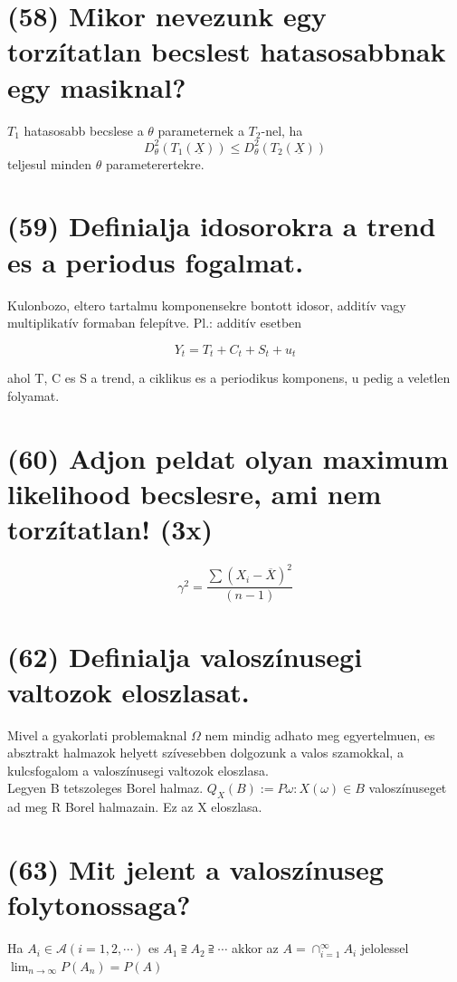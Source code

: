 \documentclass[12p]{article}
\begin{document}
\section{(58) Mikor nevezunk egy torzítatlan becslest hatasosabbnak egy masiknal?}

$T_1$ hatasosabb becslese a $\theta$ parameternek a $T_2$-nel, ha
$$D_{\theta}^2(T_1(\underline{X})) \leq D_{\theta}^2(T_2(\underline{X}))$$
teljesul minden $\theta$ parameterertekre.

\section{(59) Definialja idosorokra a trend es a periodus fogalmat.}

Kulonbozo, eltero tartalmu
komponensekre bontott idosor, additív vagy multiplikatív
formaban felepítve. Pl.: additív esetben

$$Y_t = T_t + C_t + S_t + u_t$$

ahol T, C es S a trend, a ciklikus es a periodikus komponens,
u pedig a veletlen folyamat.

\section{(60) Adjon peldat olyan maximum likelihood becslesre, ami nem torzítatlan! (3x)}

$$\gamma^2 = \frac{\sum(X_i - \overline{X})^2}{(n-1)}$$

\section{(62) Definialja valoszínusegi valtozok eloszlasat.}

Mivel a gyakorlati problemaknal $\Omega$ nem
mindig adhato meg egyertelmuen, es
absztrakt halmazok helyett szívesebben
dolgozunk a valos szamokkal, a kulcsfogalom
a valoszínusegi valtozok eloszlasa.\\
Legyen B tetszoleges Borel halmaz.
$Q_X(B):= P{\omega: X(\omega) \in B}$ valoszínuseget ad
meg R Borel halmazain. Ez az X eloszlasa.\\

\section{(63) Mit jelent a valoszínuseg folytonossaga?}

Ha $A_i \in \mathcal{A} (i = 1,2,\cdots)$ es $A_1 \supseteqq A_2 \supseteqq \cdots$ akkor az $\displaystyle{A = \cap^{\infty}_{i=1}A_i}$ jelolessel $\lim_{n \rightarrow \infty} P(A_n)=P(A)$
\end{document}
